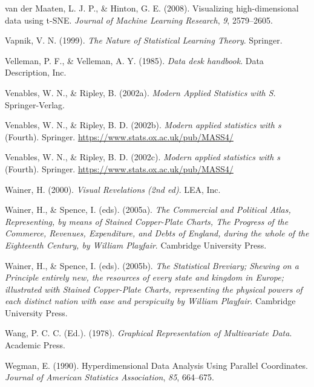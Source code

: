 \documentclass[
  letterpaper,
]{krantz}
\newlength{\cslhangindent}
\newlength{\cslentryspacingunit} %
\newenvironment{CSLReferences}[2] %
 {%
  \setlength{\parindent}{0pt}
  \ifodd #1
  \let\oldpar\par
  \def\par{\hangindent=\cslhangindent\oldpar}
  \fi
  \setlength{\parskip}{#2\cslentryspacingunit}
 }%
 {}
\begin{document}
\begin{CSLReferences}{1}{0}
\leavevmode{}%
van der Maaten, L. J. P., \& Hinton, G. E. (2008). Visualizing
high-dimensional data using t-SNE. \emph{Journal of Machine Learning
Research}, \emph{9}, 2579--2605.

\leavevmode{}%
Vapnik, V. N. (1999). \emph{The {N}ature of {S}tatistical {L}earning
{T}heory}. Springer.

\leavevmode{}%
Velleman, P. F., \& Velleman, A. Y. (1985). \emph{Data desk handbook}.
Data Description, Inc.

\leavevmode{}%
Venables, W. N., \& Ripley, B. (2002a). \emph{Modern {A}pplied
{S}tatistics with {S}}. Springer-Verlag.

\leavevmode{}%
Venables, W. N., \& Ripley, B. D. (2002b). \emph{Modern applied
statistics with s} (Fourth). Springer.
\url{https://www.stats.ox.ac.uk/pub/MASS4/}

\leavevmode{}%
Venables, W. N., \& Ripley, B. D. (2002c). \emph{Modern applied
statistics with s} (Fourth). Springer.
\url{https://www.stats.ox.ac.uk/pub/MASS4/}

\leavevmode{}%
Wainer, H. (2000). \emph{Visual {R}evelations (2nd ed)}. LEA, Inc.

\leavevmode{}%
Wainer, H., \& Spence, I. (eds). (2005a). \emph{The {C}ommercial and
{P}olitical {A}tlas, {R}epresenting, by means of {S}tained
{C}opper-{P}late {C}harts, {T}he {P}rogress of the {C}ommerce,
{R}evenues, {E}xpenditure, and {D}ebts of {E}ngland, during the whole of
the {E}ighteenth {C}entury, by {W}illiam {P}layfair}. Cambridge
University Press.

\leavevmode{}%
Wainer, H., \& Spence, I. (eds). (2005b). \emph{The {S}tatistical
{B}reviary; {S}hewing on a {P}rinciple entirely new, the resources of
every state and kingdom in {E}urope; illustrated with {S}tained
{C}opper-{P}late {C}harts, representing the physical powers of each
distinct nation with ease and perspicuity by {W}illiam {P}layfair}.
Cambridge University Press.

\leavevmode{}%
Wang, P. C. C. (Ed.). (1978). \emph{{G}raphical {R}epresentation of
{M}ultivariate {D}ata}. Academic Press.

\leavevmode{}%
Wegman, E. (1990). {H}yperdimensional {D}ata {A}nalysis {U}sing
{P}arallel {C}oordinates. \emph{Journal of American Statistics
Association}, \emph{85}, 664--675.


\end{CSLReferences}
\end{document}
